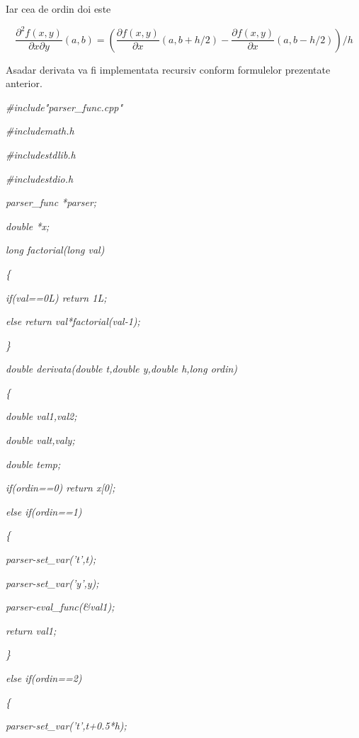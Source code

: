 \documentclass[a4paper,twoside]{book}
\begin{document}
Iar cea de ordin doi este

\begin{equation*}
\frac{\partial ^{2}f(x,y)}{\partial x\partial y}(a,b)=\left( \frac{\partial
f(x,y)}{\partial x}(a,b+h/2)-\frac{\partial f(x,y)}{\partial x}%
(a,b-h/2)\right) /h
\end{equation*}

Asadar derivata va fi implementata recursiv conform formulelor prezentate
anterior.

\textit{\#include"parser\_func.cpp"}

\textit{\#include\TEXTsymbol{<}math.h\TEXTsymbol{>}}

\textit{\#include\TEXTsymbol{<}stdlib.h\TEXTsymbol{>}}

\textit{\#include\TEXTsymbol{<}stdio.h\TEXTsymbol{>}}

\textit{parser\_func *parser;}

\textit{double *x;}

\textit{long factorial(long val)}

\textit{\{}

\textit{\qquad if(val==0L) return 1L;}

\textit{\qquad else return val*factorial(val-1);}

\textit{\}}

\textit{double derivata(double t,double y,double h,long ordin)}

\textit{\{}

\textit{\qquad double val1,val2;}

\textit{\qquad double valt,valy;}

\textit{\qquad double temp;}

\textit{\qquad if(ordin==0) return x[0];}

\textit{\qquad else if(ordin==1)}

\textit{\qquad \{}

\textit{\qquad \qquad parser-\TEXTsymbol{>}set\_var('t',t);}

\textit{\qquad \qquad parser-\TEXTsymbol{>}set\_var('y',y);}

\textit{\qquad \qquad parser-\TEXTsymbol{>}eval\_func(\&val1);}

\textit{\qquad \qquad return val1;}

\textit{\qquad \}}

\textit{\qquad else if(ordin==2)}

\textit{\qquad \{}

\textit{\qquad \qquad \qquad parser-\TEXTsymbol{>}set\_var('t',t+0.5*h);}
\end{document}
